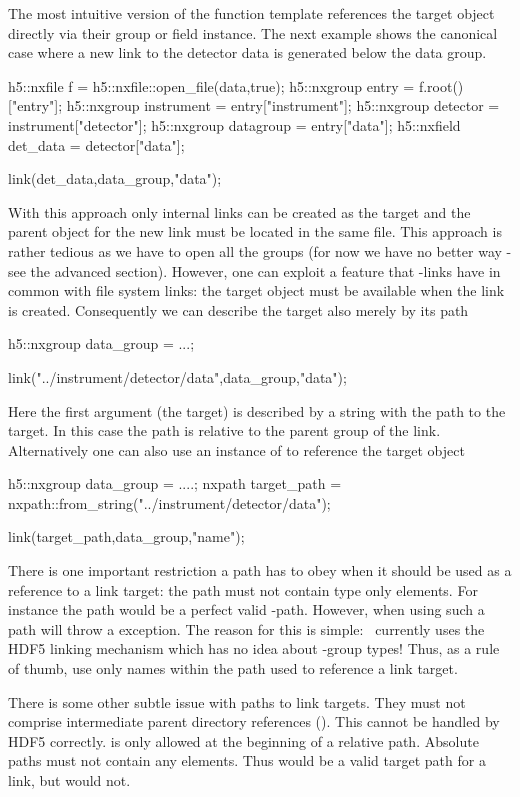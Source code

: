 The most intuitive version of the  function template references the
target object directly via their group or field instance. The next example shows
the canonical case where a new link to the detector data is generated below the
data group. 
\begin{cppcode}
h5::nxfile  f          = h5::nxfile::open_file(data,true);
h5::nxgroup entry      = f.root()["entry"];
h5::nxgroup instrument = entry["instrument"];
h5::nxgroup detector   = instrument["detector"];
h5::nxgroup datagroup  = entry["data"];
h5::nxfield det_data   = detector["data"];

link(det_data,data_group,"data");
\end{cppcode}
With this approach only internal links can be created as the target and the
parent object for the new link must be located in the same file. 
This approach is rather tedious as we have to open all the groups (for now we
have no better way - see the advanced section). However, one can exploit a
feature that \nexus-links have in common with file system links: the target
object must be available when the link is created. Consequently we can describe
the target also merely by its path
\begin{cppcode}
h5::nxgroup data_group = ...;

link("../instrument/detector/data",data_group,"data");
\end{cppcode}
Here the first argument (the target) is described by a string with the path to
the target. In this case the path is relative to the parent group of the link. 
Alternatively one can also use an instance of  to reference the 
target object
\begin{cppcode}
h5::nxgroup data_group = ....;
nxpath target_path = nxpath::from_string("../instrument/detector/data");

link(target_path,data_group,"name");
\end{cppcode}
There is one important restriction a path has to obey when it should be used as
a reference to a link target: the path must not contain type only elements. 
For instance the path  would be a
perfect valid \nexus-path. However, when using such a path  will throw
a  exception. The reason for this is simple: \libpniio\
currently uses the HDF5 linking mechanism which has no idea about \nexus-group
types!
Thus, as a rule of thumb, use only names within the path used to reference a
link target.

There is some other subtle issue with paths to link targets. They must not
comprise intermediate parent directory references (). 
This cannot be handled by HDF5 correctly.  is only allowed at the 
beginning of a relative path. Absolute paths must not contain any \cpp{..} 
elements. 
Thus  would be a valid target path for a link, 
but \cpp{/../entry/../entry} would not. 

